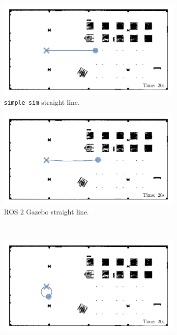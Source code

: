\begin{figure}[H]
  \centering
  \begin{subfigure}[b]{0.45\textwidth}
    \centering
    \includegraphics[width=\textwidth]{./figures/plots/consistency/simple-sim-paths-straight.png}
    \caption{\texttt{simple\_sim} straight line.}
  \end{subfigure}
  \begin{subfigure}[b]{0.45\textwidth}
    \centering
    \includegraphics[width=\textwidth]{./figures/plots/consistency/ros-2-paths-straight.png}
    \caption{ROS 2 Gazebo straight line.}
  \end{subfigure}\\
  \begin{subfigure}[b]{0.45\textwidth}
    \centering
    \includegraphics[width=\textwidth]{./figures/plots/consistency/simple-sim-paths-circle.png}

\end{subfigure}
\end{figure}
